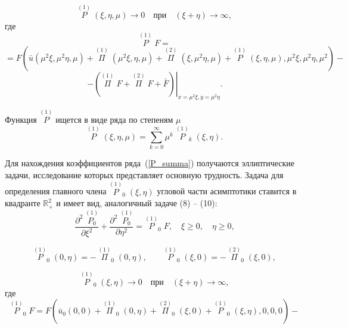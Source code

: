 \documentclass[12pt]{article}
\begin{document}
\begin{equation*}
	\overset{(1)}{P} \; (\xi, \eta, \mu) \to 0 \quad \text{при} \quad (\xi + \eta) \to \infty,
\end{equation*}
где
\begin{equation*}
	\overset{(1)}{P} \; F =
\end{equation*}
\begin{equation*}
	= F \left( \bar u (\mu^2 \xi, \mu^2 \eta, \mu) + \overset{(1)}{\Pi} \; (\mu^2 \xi, \eta, \mu) + \overset{(2)}{\Pi} \; (\xi, \mu^2 \eta, \mu) + \overset{(1)}{P} \; (\xi, \eta, \mu), \mu^2 \xi, \mu^2 \eta, \mu^2 \right) -
\end{equation*}
\begin{equation*}
	- \left. \left( \overset{(1)}{\Pi} \; F + \overset{(2)}{\Pi} \; F + \bar F \right) \right|_{x = \mu^2 \xi, y = \mu^2 \eta}.
\end{equation*}

Функция $\overset{(1)}{P}$ ищется в виде ряда по степеням $\mu$
\begin{equation} \label {P_summa}
	\overset{(1)}{P} \; (\xi, \eta, \mu) = \sum_{k = 0}^\infty \mu^k \; \overset{(1)}{P}_k \; (\xi, \eta).
\end{equation}

Для нахождения коэффициентов ряда~(\ref{P_summa}) получаются эллиптические задачи, исследование которых представляет основную трудность. Задача для определения главного члена $\overset{(1)}{P}_0 \; (\xi, \eta)$ угловой части асимптотики ставится в квадранте $\mathbb{R}_+^2$ и имеет вид, аналогичный задаче (8) -- (10):
\begin{equation} \label {main_task1}
	\frac{\partial^2 \; \overset{(1)}{P_0}}{\partial \xi^2} + \frac{\partial^2 \; \overset{(1)}{P_0}}{\partial \eta^2} = \overset{(1)}{P}_0 \; F, \quad \xi \ge 0, \quad \eta \ge 0, 
\end{equation}

\begin{equation}
	\overset{(1)}{P}_0 \; (0, \eta) = -\, \overset{(1)}{\Pi}_0 \; (0, \eta), \qquad
\overset{(1)}{P}_0 \; (\xi, 0) = -\, \overset{(2)}{\Pi}_0 \; (\xi, 0),
\end{equation}

\begin{equation} \label {main_task2}
	\overset{(1)}{P}_0 \; (\xi, \eta) \to 0 \quad \text{при} \quad (\xi + \eta) \to \infty, 
\end{equation}
где
\begin{equation*}
	\overset{(1)}{P}_0 \; F = F \left( \bar u_0(0, 0) + \overset{(1)}{\Pi}_0 \; (0, \eta) +  \overset{(2)}{\Pi}_0 \; (\xi, 0) + \overset{(1)}{P}_0 \; (\xi, \eta), 0, 0, 0 \right) -
\end{equation*}
\end{document}
